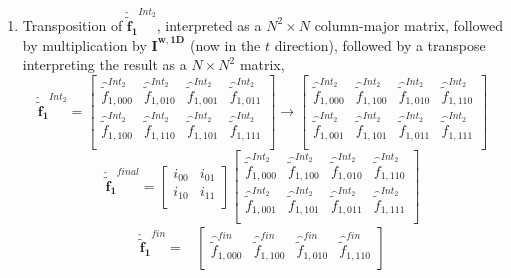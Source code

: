 \documentclass[12pt,Bold,letterpaper,TexShade]{mcgilletdclass}
\numberwithin{equation}{section}
\newcommand{\mat}[1]{\bm{{#1}}}
\newcommand{\vect}[1]{\bm{{#1}}}
\begin{document}
\begin{enumerate}
\item Transposition of $\vect{\hat{\tilde{f}}_{1}}^{Int_2}$, interpreted as a $N^2 \times N$ column-major matrix, followed by multiplication by $\mat{I^{w,1D}}$ (now in the $t$ direction), followed by a transpose interpreting the result as a $N \times N^2$ matrix,
\begin{equation} \nonumber
\vect{\hat{\tilde{f}}_{1}}^{Int_2}
=
\begin{bmatrix}
\hat{\tilde{f}}^{Int_2}_{1,000} & \hat{\tilde{f}}^{Int_2}_{1,010} & \hat{\tilde{f}}^{Int_2}_{1,001} & \hat{\tilde{f}}^{Int_2}_{1,011} \\
\hat{\tilde{f}}^{Int_2}_{1,100} & \hat{\tilde{f}}^{Int_2}_{1,110} & \hat{\tilde{f}}^{Int_2}_{1,101} & \hat{\tilde{f}}^{Int_2}_{1,111} \\
\end{bmatrix}
\rightarrow
\begin{bmatrix}
\hat{\tilde{f}}^{Int_2}_{1,000} & \hat{\tilde{f}}^{Int_2}_{1,100} & \hat{\tilde{f}}^{Int_2}_{1,010} & \hat{\tilde{f}}^{Int_2}_{1,110} \\
\hat{\tilde{f}}^{Int_2}_{1,001} & \hat{\tilde{f}}^{Int_2}_{1,101} & \hat{\tilde{f}}^{Int_2}_{1,011} & \hat{\tilde{f}}^{Int_2}_{1,111} \\
\end{bmatrix}
\end{equation}
\begin{equation} \nonumber
\vect{\hat{\tilde{f}}_{1}}^{final}
=
\begin{bmatrix}
i_{00} & i_{01} \\
i_{10} & i_{11} \\
\end{bmatrix}
\begin{bmatrix}
\hat{\tilde{f}}^{Int_2}_{1,000} & \hat{\tilde{f}}^{Int_2}_{1,100} & \hat{\tilde{f}}^{Int_2}_{1,010} & \hat{\tilde{f}}^{Int_2}_{1,110} \\
\hat{\tilde{f}}^{Int_2}_{1,001} & \hat{\tilde{f}}^{Int_2}_{1,101} & \hat{\tilde{f}}^{Int_2}_{1,011} & \hat{\tilde{f}}^{Int_2}_{1,111} \\
\end{bmatrix}
\end{equation}
\begin{equation} \nonumber
\begin{split}
\vect{\hat{\tilde{f}}_{1}}^{fin}
= &
\begin{bmatrix}
\hat{\tilde{f}}^{fin}_{1,000} & \hat{\tilde{f}}^{fin}_{1,100} & \hat{\tilde{f}}^{fin}_{1,010} & \hat{\tilde{f}}^{fin}_{1,110} \\

\end{bmatrix}
\end{split}
\end{equation}
\end{enumerate}
\end{document}
